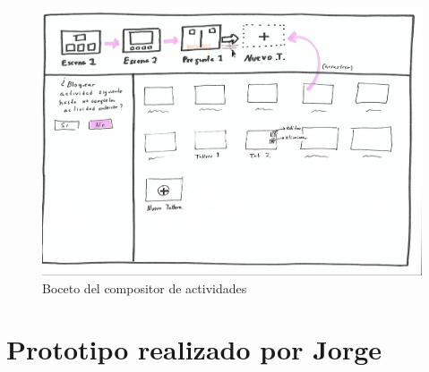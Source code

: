 \begin{figure}[h!]
	\centering
	\includegraphics[width=0.7\linewidth]{Imagenes/Bitmap/presentacionTableros}
	\caption{Boceto del compositor de actividades}
	\label{fig:presentaciontableros}
\end{figure}


\section*{Prototipo realizado por Jorge}

